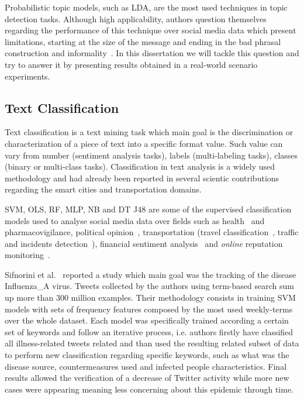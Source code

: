 Probabilistic topic models, such as \gls{LDA}, are the most used techniques in topic detection tasks. Although high applicability, authors question themselves regarding the performance of this technique over social media data which present limitations, starting at the size of the message and ending in the bad phrasal construction and informality~\cite{mehrotra2013improving}. In this dissertation we will tackle this question and try to answer it by presenting results obtained in a real-world scenario experiments.

\subsection{Text Classification}

Text classification is a text mining task which main goal is the discrimination or characterization of a piece of text into a specific format value. Such value can vary from number (sentiment analysis tasks), labels (multi-labeling tasks), classes (binary or multi-class tasks). Classification in text analysis is a widely used methodology and had already been reported in several scientic contributions regarding the smart cities and transportation domains.

\gls{SVM}, \gls{OLS}, \gls{RF}, \gls{MLP}, \gls{NB} and \gls{DT J48} are some of the supervised classification models used to analyse social media data over fields such as health~\cite{signorini2011use} and pharmacovigilance, political opinion~\cite{saleiro2016sentiment}, transportation (travel classification~\cite{carvalho2010real, kuflik2017automating}, traffic and incidents detection~\cite{zhang2016mining}), financial sentiment analysis~\cite{saleiro2017feup} and \textit{online} reputation monitoring~\cite{saleiro2017texrep}.

Sifnorini et al.~\cite{signorini2011use} reported a study which main goal was the tracking of the disease \gls{Influenza_A} virus. Tweets collected by the authors using term-based search sum up more than 300 million examples. Their methodology consists in training \gls{SVM} models with sets of frequency features composed by the most used weekly-terms over the whole dataset. Each model was specifically trained according a certain set of keywords and follow an iterative process, i.e. authors firstly have classified all illness-related tweets related and than used the resulting related subset of data to perform new classification regarding specific keywords, such as what was the disease source, countermeasures used and infected people characteristics. Final results allowed the verification of a decrease of Twitter activity while more new cases were appearing meaning less concerning about this epidemic through time.

